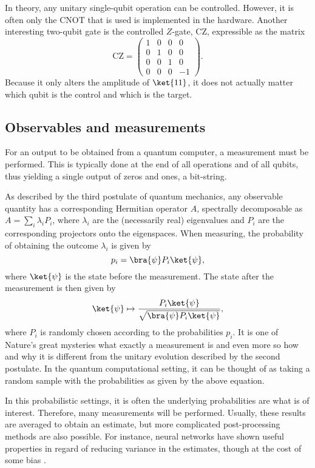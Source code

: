 In theory, any unitary single-qubit operation can be controlled.
However, it is often only the CNOT that is used is implemented in the hardware.
Another interesting two-qubit gate is the controlled $Z$-gate, CZ, expressible as the matrix
\begin{equation}
    \text{CZ} = \begin{pmatrix} 1 & 0 & 0 & 0 \\ 0 & 1 & 0 & 0 \\ 0 & 0 & 1 & 0 \\ 0 & 0 & 0 & -1 \end{pmatrix}.
\end{equation}
Because it only alters the amplitude of $\ket{11}$, it does not actually matter which qubit is the control and which is the target.

\subsection{Observables and measurements}
For an output to be obtained from a quantum computer, a measurement must be performed.
This is typically done at the end of all operations and of all qubits, thus yielding a single output of zeros and ones, a bit-string.

As described by the third postulate of quantum mechanics, any observable quantity has a corresponding Hermitian operator $A$, spectrally decomposable as $A = \sum_{i} \lambda_i P_i$, where $\lambda_i$ are the (necessarily real) eigenvalues and $P_i$ are the corresponding projectors onto the eigenspaces.
When measuring, the probability of obtaining the outcome $\lambda_i$ is given by
\begin{equation}
    p_i = \bra{\psi} P_i \ket{\psi},
\end{equation}
where $\ket{\psi}$ is the state before the measurement.
The state after the measurement is then given by
\begin{equation}
    \ket{\psi} \mapsto \frac{P_i \ket{\psi}}{\sqrt{\bra{\psi} P_i \ket{\psi}}},
\end{equation}
where $P_i$ is randomly chosen according to the probabilities $p_i$.
It is one of Nature's great mysteries what exactly a measurement is and even more so how and why it is different from the unitary evolution described by the second postulate.
In the quantum computational setting, it can be thought of as taking a random sample with the probabilities as given by the above equation.

In this probabilistic settings, it is often the underlying probabilities are what is of interest.
Therefore, many measurements will be performed.
Usually, these results are averaged to obtain an estimate, but more complicated post-processing methods are also possible.
For instance, neural networks have shown useful properties in regard of reducing variance in the estimates, though at the cost of some bias \cite{torlai2020}.

